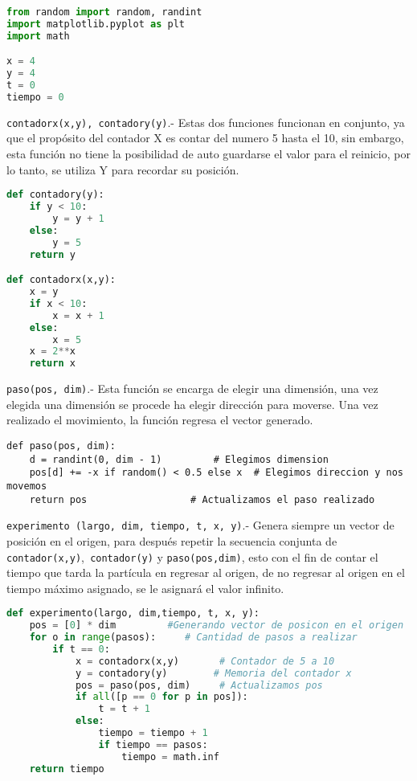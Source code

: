 \documentclass{article}
\begin{document}
\begin{lstlisting}[language=Python]
from random import random, randint
import matplotlib.pyplot as plt
import math

x = 4
y = 4
t = 0
tiempo = 0
\end{lstlisting}



\texttt{contadorx(x,y), contadory(y)}.- Estas dos funciones funcionan en conjunto, ya que el propósito del contador X es contar del numero 5 hasta el 10, sin embargo, esta función no tiene la posibilidad de auto guardarse el valor para el reinicio, por lo tanto, se utiliza Y para recordar su posición.

\begin{lstlisting}[language=Python]
def contadory(y):
    if y < 10:
        y = y + 1
    else:
        y = 5
    return y

def contadorx(x,y):
    x = y
    if x < 10:
        x = x + 1
    else:
        x = 5
    x = 2**x
    return x
\end{lstlisting}

\texttt{paso(pos, dim)}.- Esta función se encarga de elegir una dimensión, una vez elegida una dimensión se procede ha elegir dirección para moverse. Una vez realizado el movimiento, la función regresa el vector generado.


\begin{lstlisting}
def paso(pos, dim):
    d = randint(0, dim - 1)     	# Elegimos dimension
    pos[d] += -x if random() < 0.5 else x  # Elegimos direccion y nos movemos
    return pos        			# Actualizamos el paso realizado
\end{lstlisting}

\texttt{experimento (largo, dim, tiempo, t, x, y)}.- Genera siempre un vector de posición en el origen, para después repetir la secuencia conjunta de \texttt{contador(x,y)},\texttt{ contador(y)} y \texttt{paso(pos,dim)}, esto con el fin de contar el tiempo que tarda la partícula en regresar al origen, de no regresar al origen en el tiempo máximo asignado,  se le asignará el valor infinito.

\begin{lstlisting}[language=Python]
def experimento(largo, dim,tiempo, t, x, y):
    pos = [0] * dim     	#Generando vector de posicon en el origen
    for o in range(pasos):     # Cantidad de pasos a realizar
        if t == 0:
            x = contadorx(x,y)       # Contador de 5 a 10
            y = contadory(y)        # Memoria del contador x
            pos = paso(pos, dim)     # Actualizamos pos
            if all([p == 0 for p in pos]):
                t = t + 1
            else:
                tiempo = tiempo + 1
                if tiempo == pasos:
                    tiempo = math.inf
    return tiempo
\end{lstlisting}
\end{document}

